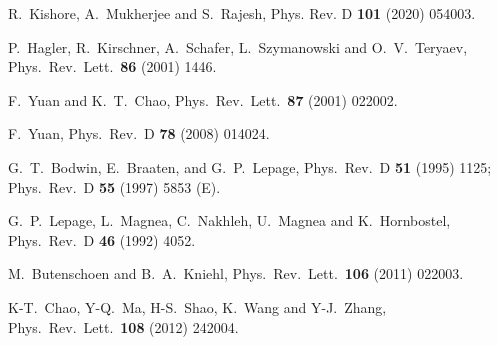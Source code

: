 \documentclass[prd,aps,preprintnumbers,nofootinbib,superscriptaddress]{revtex4}
\begin{document}
\begin{thebibliography}{99}
R.~Kishore, A.~Mukherjee and S.~Rajesh,
Phys. Rev. D \textbf{101} (2020) 054003.

  P.~Hagler, R.~Kirschner, A.~Schafer, L.~Szymanowski and O.~V.~Teryaev,
  Phys.\ Rev.\ Lett.\  {\bf 86} (2001) 1446.

  F.~Yuan and K.~T.~Chao,
  Phys.\ Rev.\ Lett.\  {\bf 87} (2001) 022002.

  F.~Yuan,
  Phys.\ Rev.\  D {\bf 78} (2008)  014024.

  G.~T.~Bodwin, E.~Braaten, and G.~P.~Lepage,
  Phys.\ Rev.\ D {\bf 51} (1995) 1125;  Phys.\ Rev.\ D {\bf 55} (1997) 
  5853 (E).

  G.~P.~Lepage, L.~Magnea, C.~Nakhleh, U.~Magnea and K.~Hornbostel,
  Phys.\ Rev.\ D {\bf 46} (1992) 4052.

  M.~Butenschoen and B.~A.~Kniehl,
  Phys.\ Rev.\ Lett.\  {\bf 106} (2011) 022003.

K-T.~Chao, Y-Q.~Ma, H-S.~Shao, K.~Wang and Y-J.~Zhang,
Phys.\ Rev.\ Lett.\ {\bf108} (2012) 242004.


\end{thebibliography}
\end{document}
